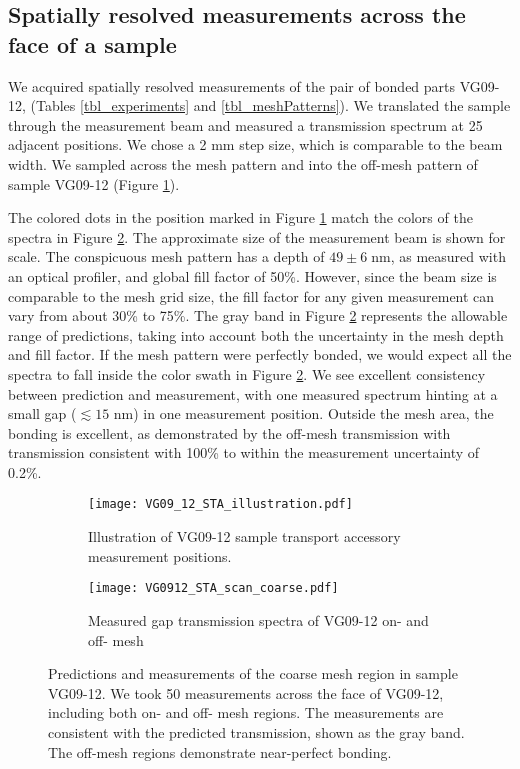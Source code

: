 \documentclass[osajnl,twocolumn,showpacs,superscriptaddress,11pt]{revtex4-1} %
\begin{document}
\subsection{Spatially resolved measurements across the face of a sample}
We acquired spatially resolved measurements of the pair of bonded parts VG09-12, (Tables \ref{tbl_experiments} and \ref{tbl_meshPatterns}).  We translated the sample through the measurement beam and measured a transmission spectrum at 25 adjacent positions.  We chose a 2 mm step size, which is comparable to the beam width.  We sampled across the mesh pattern and into the off-mesh pattern of sample VG09-12 (Figure \ref{figVG0912_STA_illus}).

The colored dots in the position marked in Figure \ref{figVG0912_STA_illus} match the colors of the spectra in Figure \ref{figVG0912}.  The approximate size of the measurement beam is shown for scale.  The conspicuous mesh pattern has a depth of $49\pm6\;$nm, as measured with an optical profiler, and global fill factor of 50\%.  However, since the beam size is comparable to the mesh grid size, the fill factor for any given measurement can vary from about 30\% to 75\%.  The gray band in Figure \ref{figVG0912} represents the allowable range of predictions, taking into account both the uncertainty in the mesh depth and fill factor.  If the mesh pattern were perfectly bonded, we would expect all the spectra to fall inside the color swath in Figure \ref{figVG0912}.  We see excellent consistency between prediction and measurement, with one measured spectrum hinting at a small gap ($\lesssim15$ nm) in one measurement position.  Outside the mesh area, the bonding is excellent, as demonstrated by the off-mesh transmission with transmission consistent with 100\% to within the measurement uncertainty of 0.2\%.


\begin{figure}[!htbp]
    \centering
    \begin{subfigure}[b]{0.35\textwidth}
        \texttt{[image: VG09\_12\_STA\_illustration.pdf]}
        \caption{Illustration of VG09-12 sample transport accessory measurement positions. \label{figVG0912_STA_illus} }
    \end{subfigure}
    \begin{subfigure}[b]{0.45\textwidth}
        \texttt{[image: VG0912\_STA\_scan\_coarse.pdf]}
        \caption{Measured gap transmission spectra of VG09-12 on- and off- mesh \label{figVG0912}}
    \end{subfigure}
\caption{Predictions and measurements of the coarse mesh region in sample VG09-12.  We took 50 measurements across the face of VG09-12, including both on- and off- mesh regions.  The measurements are consistent with the predicted transmission, shown as the gray band.  The off-mesh regions demonstrate near-perfect bonding.\label{figVG12sta}}
\end{figure}
\end{document}

